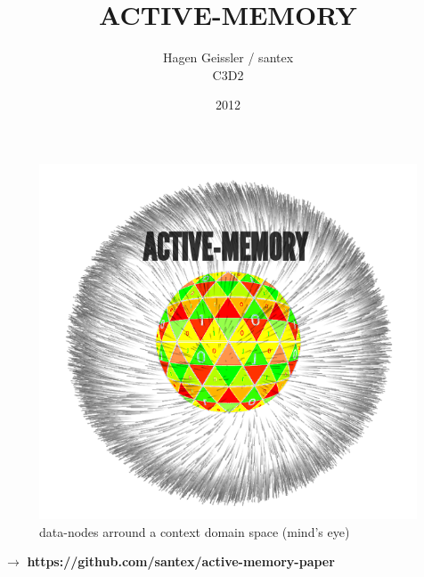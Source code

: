 \documentclass[15pt]{article}
\begin{document}
\vskip 1cm

\begin{figure}[htp]
\includegraphics[scale=0.74]{./img/artee-1.png}
\caption{data-nodes arround a context domain space (mind's eye)}

\end{figure}


\title{\textbf{ACTIVE-MEMORY}}
\author{Hagen Geissler / santex\\
		C3D2}
\date{2012}


\maketitle


$\rightarrow$ \textbf{https://github.com/santex/active-memory-paper}
\end{document}
